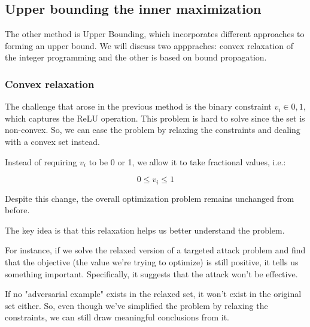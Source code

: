 \subsection{Upper bounding the inner maximization}


The other method is Upper Bounding, which incorporates different approaches to forming an upper bound. We will discuss two apppraches: convex relaxation of the integer programming and the other 
is based on bound propagation.

\subsubsection{Convex relaxation}

The challenge that arose in the previous method is the binary constraint $v_i \in {0, 1}$, which 
captures the ReLU operation. This problem is hard to solve since the set is non-convex. 
So, we can ease the problem by relaxing the constraints and dealing with a convex set instead.

Instead of requiring $v_i$ to be 0 or 1, we allow it to take fractional values, i.e.:

\[ 0  \leq v_i \leq 1\]


Despite this change, the overall optimization problem remains unchanged from before.

The key idea is that this relaxation helps us better understand the problem. 

For instance, if we solve the relaxed version of a targeted attack problem and
find that the objective (the value we're trying to optimize) is still positive, 
it tells us something important. Specifically, it suggests that the attack won't be effective.


If no "adversarial example" exists in the relaxed set, it won't exist in the original 
set either. So, even though we've simplified the problem by relaxing the constraints, we 
can still draw meaningful conclusions from it.
